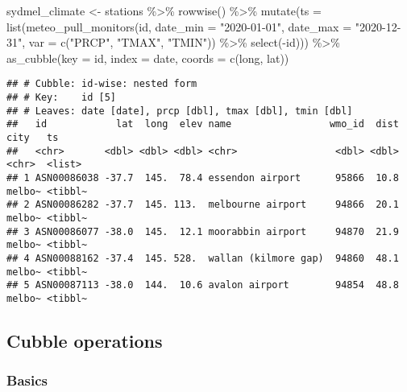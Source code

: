 \documentclass{article}
\newenvironment{Shaded}{\begin{snugshade}}{\end{snugshade}}
\newcommand{\AttributeTok}[1]{\textcolor[rgb]{0.77,0.63,0.00}{#1}}
\newcommand{\FunctionTok}[1]{\textcolor[rgb]{0.00,0.00,0.00}{#1}}
\newcommand{\NormalTok}[1]{#1}
\newcommand{\OtherTok}[1]{\textcolor[rgb]{0.56,0.35,0.01}{#1}}
\newcommand{\SpecialCharTok}[1]{\textcolor[rgb]{0.00,0.00,0.00}{#1}}
\newcommand{\StringTok}[1]{\textcolor[rgb]{0.31,0.60,0.02}{#1}}
\begin{document}
\begin{Shaded}
\begin{Highlighting}[]
\NormalTok{sydmel\_climate }\OtherTok{\textless{}{-}}\NormalTok{ stations }\SpecialCharTok{\%\textgreater{}\%} 
  \FunctionTok{rowwise}\NormalTok{() }\SpecialCharTok{\%\textgreater{}\%} 
  \FunctionTok{mutate}\NormalTok{(}\AttributeTok{ts =} \FunctionTok{list}\NormalTok{(}\FunctionTok{meteo\_pull\_monitors}\NormalTok{(id, }
                                       \AttributeTok{date\_min =} \StringTok{"2020{-}01{-}01"}\NormalTok{, }
                                       \AttributeTok{date\_max =} \StringTok{"2020{-}12{-}31"}\NormalTok{,}
                                       \AttributeTok{var =} \FunctionTok{c}\NormalTok{(}\StringTok{"PRCP"}\NormalTok{, }\StringTok{"TMAX"}\NormalTok{, }\StringTok{"TMIN"}\NormalTok{)) }\SpecialCharTok{\%\textgreater{}\%} 
                     \FunctionTok{select}\NormalTok{(}\SpecialCharTok{{-}}\NormalTok{id))) }\SpecialCharTok{\%\textgreater{}\%} 
  \FunctionTok{as\_cubble}\NormalTok{(}\AttributeTok{key =}\NormalTok{ id, }\AttributeTok{index =}\NormalTok{ date, }\AttributeTok{coords =} \FunctionTok{c}\NormalTok{(long, lat))}
\end{Highlighting}
\end{Shaded}

\begin{verbatim}
## # Cubble: id-wise: nested form
## # Key:    id [5]
## # Leaves: date [date], prcp [dbl], tmax [dbl], tmin [dbl]
##   id            lat  long  elev name                 wmo_id  dist city   ts     
##   <chr>       <dbl> <dbl> <dbl> <chr>                 <dbl> <dbl> <chr>  <list> 
## 1 ASN00086038 -37.7  145.  78.4 essendon airport      95866  10.8 melbo~ <tibbl~
## 2 ASN00086282 -37.7  145. 113.  melbourne airport     94866  20.1 melbo~ <tibbl~
## 3 ASN00086077 -38.0  145.  12.1 moorabbin airport     94870  21.9 melbo~ <tibbl~
## 4 ASN00088162 -37.4  145. 528.  wallan (kilmore gap)  94860  48.1 melbo~ <tibbl~
## 5 ASN00087113 -38.0  144.  10.6 avalon airport        94854  48.8 melbo~ <tibbl~
\end{verbatim}

\newpage

\hypertarget{cubble-operations}{%
\subsection{Cubble operations}\label{cubble-operations}}

\hypertarget{basics}{%
\subsubsection{Basics}\label{basics}}
\end{document}
